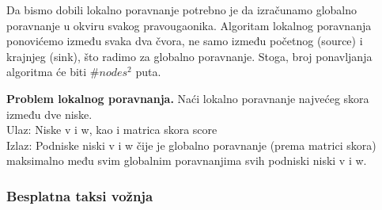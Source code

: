 \noindent Da bismo dobili lokalno poravnanje potrebno je da izračunamo globalno poravnanje u okviru svakog pravougaonika. Algoritam lokalnog poravnanja ponovićemo između svaka dva čvora, ne samo između početnog (source) i krajnjeg (sink), što radimo za globalno poravnanje. Stoga, broj ponavljanja algoritma će biti $\#nodes ^ 2$ puta. 

\begin{tcolorbox}\textbf{Problem lokalnog poravnanja.}
	Naći lokalno poravnanje najvećeg skora između dve niske. \\
	Ulaz: Niske v i w, kao i matrica skora score \\
	Izlaz: Podniske niski v i w čije je globalno poravnanje (prema matrici skora) maksimalno među svim globalnim poravnanjima svih podniski niski v i w. 
\end{tcolorbox}


\subsubsection{Besplatna taksi vožnja}

